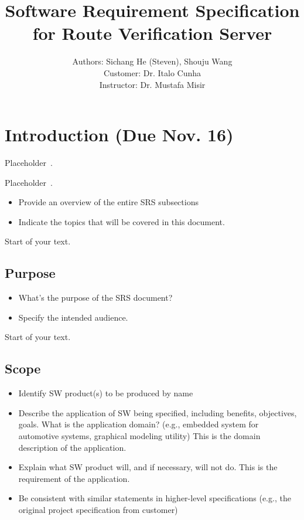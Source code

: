 \documentclass[12pt]{article}
\title{Software Requirement Specification for Route Verification Server}
\author
    {Authors: Sichang He (Steven), Shouju Wang\\
    Customer: Dr. Italo Cunha\\
    Instructor: Dr. Mustafa Misir
}
\begin{document}
\maketitle

\section{{}{Introduction (Due Nov. 16)}}\label{introduction-due-nov.-16}

Placeholder~\cite{alaettinoglurfc}.

Placeholder~\cite{blunk2005rfc}.

\begin{itemize}
\item
  Provide an overview of the entire SRS subsections
\item
  Indicate the topics that will be covered in this document.
\end{itemize}

Start of your text.

\subsection{Purpose}\label{purpose}

\begin{itemize}
\item
  What's the purpose of the SRS document?
\item
  Specify the intended audience.
\end{itemize}

Start of your text.

\subsection{Scope}\label{scope}

\begin{itemize}
\item
  Identify SW product(s) to be produced by name
\item
  Describe the application of SW being specified, including benefits,
  objectives, goals. What is the application domain? (e.g., embedded
  system for automotive systems, graphical modeling utility) This is the
  domain description of the application.
\item
  Explain what SW product will, and if necessary, will not do. This is
  the requirement of the application.
\item
  Be consistent with similar statements in higher-level specifications
  (e.g., the original project specification from customer)
\end{itemize}
\end{document}
